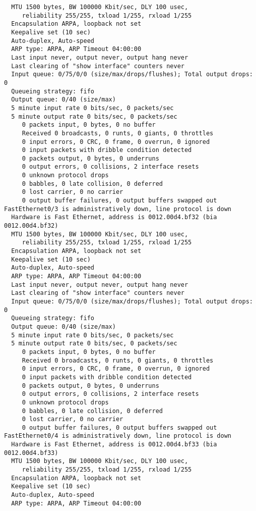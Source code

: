 \begin{lstlisting}
  MTU 1500 bytes, BW 100000 Kbit/sec, DLY 100 usec, 
     reliability 255/255, txload 1/255, rxload 1/255
  Encapsulation ARPA, loopback not set
  Keepalive set (10 sec)
  Auto-duplex, Auto-speed
  ARP type: ARPA, ARP Timeout 04:00:00
  Last input never, output never, output hang never
  Last clearing of "show interface" counters never
  Input queue: 0/75/0/0 (size/max/drops/flushes); Total output drops: 0
  Queueing strategy: fifo
  Output queue: 0/40 (size/max)
  5 minute input rate 0 bits/sec, 0 packets/sec
  5 minute output rate 0 bits/sec, 0 packets/sec
     0 packets input, 0 bytes, 0 no buffer
     Received 0 broadcasts, 0 runts, 0 giants, 0 throttles
     0 input errors, 0 CRC, 0 frame, 0 overrun, 0 ignored
     0 input packets with dribble condition detected
     0 packets output, 0 bytes, 0 underruns
     0 output errors, 0 collisions, 2 interface resets
     0 unknown protocol drops
     0 babbles, 0 late collision, 0 deferred
     0 lost carrier, 0 no carrier
     0 output buffer failures, 0 output buffers swapped out
FastEthernet0/3 is administratively down, line protocol is down 
  Hardware is Fast Ethernet, address is 0012.00d4.bf32 (bia 0012.00d4.bf32)
  MTU 1500 bytes, BW 100000 Kbit/sec, DLY 100 usec, 
     reliability 255/255, txload 1/255, rxload 1/255
  Encapsulation ARPA, loopback not set
  Keepalive set (10 sec)
  Auto-duplex, Auto-speed
  ARP type: ARPA, ARP Timeout 04:00:00
  Last input never, output never, output hang never
  Last clearing of "show interface" counters never
  Input queue: 0/75/0/0 (size/max/drops/flushes); Total output drops: 0
  Queueing strategy: fifo
  Output queue: 0/40 (size/max)
  5 minute input rate 0 bits/sec, 0 packets/sec
  5 minute output rate 0 bits/sec, 0 packets/sec
     0 packets input, 0 bytes, 0 no buffer
     Received 0 broadcasts, 0 runts, 0 giants, 0 throttles
     0 input errors, 0 CRC, 0 frame, 0 overrun, 0 ignored
     0 input packets with dribble condition detected
     0 packets output, 0 bytes, 0 underruns
     0 output errors, 0 collisions, 2 interface resets
     0 unknown protocol drops
     0 babbles, 0 late collision, 0 deferred
     0 lost carrier, 0 no carrier
     0 output buffer failures, 0 output buffers swapped out
FastEthernet0/4 is administratively down, line protocol is down 
  Hardware is Fast Ethernet, address is 0012.00d4.bf33 (bia 0012.00d4.bf33)
  MTU 1500 bytes, BW 100000 Kbit/sec, DLY 100 usec, 
     reliability 255/255, txload 1/255, rxload 1/255
  Encapsulation ARPA, loopback not set
  Keepalive set (10 sec)
  Auto-duplex, Auto-speed
  ARP type: ARPA, ARP Timeout 04:00:00

\end{lstlisting}
